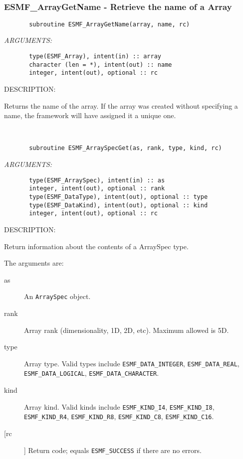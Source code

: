  
\mbox{}\hrulefill\ 
 
\subsubsection [ESMF\_ArrayGetName] {ESMF\_ArrayGetName - Retrieve the name of a Array}


  
\begin{verbatim}       subroutine ESMF_ArrayGetName(array, name, rc)\end{verbatim}{\em ARGUMENTS:}
\begin{verbatim}       type(ESMF_Array), intent(in) :: array
       character (len = *), intent(out) :: name
       integer, intent(out), optional :: rc\end{verbatim}
{\sf DESCRIPTION:\\ }


   Returns the name of the array. If the array was created without
   specifying a name, the framework will have assigned it a unique one.
   
 
\mbox{}\hrulefill\ 
 

\begin{verbatim}       subroutine ESMF_ArraySpecGet(as, rank, type, kind, rc)\end{verbatim}{\em ARGUMENTS:}
\begin{verbatim}       type(ESMF_ArraySpec), intent(in) :: as
       integer, intent(out), optional :: rank
       type(ESMF_DataType), intent(out), optional :: type
       type(ESMF_DataKind), intent(out), optional :: kind
       integer, intent(out), optional :: rc\end{verbatim}
{\sf DESCRIPTION:\\ }


   Return information about the contents of a ArraySpec type.
  
   The arguments are:
   \begin{description}
  
   \item[as]
   An {\tt ArraySpec} object.
  
   \item[rank]
   Array rank (dimensionality, 1D, 2D, etc). Maximum allowed is 5D.
  
   \item[type]
   Array type. Valid types include {\tt ESMF\_DATA\_INTEGER},
   {\tt ESMF\_DATA\_REAL}, {\tt ESMF\_DATA\_LOGICAL},
   {\tt ESMF\_DATA\_CHARACTER}.
  
   \item[kind]
   Array kind. Valid kinds include {\tt ESMF\_KIND\_I4},
   {\tt ESMF\_KIND\_I8}, {\tt ESMF\_KIND\_R4}, {\tt ESMF\_KIND\_R8},
   {\tt ESMF\_KIND\_C8}, {\tt ESMF\_KIND\_C16}.
  
   \item[[rc]]
   Return code; equals {\tt ESMF\_SUCCESS} if there are no errors.
  
   \end{description}
   
